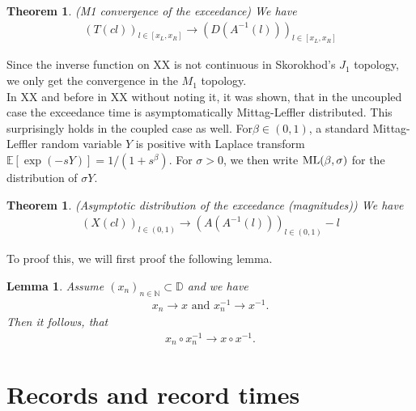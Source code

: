 \documentclass[12pt]{article}
\newtheorem{theorem}[equation]{Theorem}
\newtheorem{lemma}[equation]{Lemma}
\newcommand{\N}{\mathbb{N}}
\newcommand{\E}{\mathbb{E}}
\newcommand{\1}{\mathbf 1}
\newcommand{\D}{\mathbb{D}}
\begin{document}
\begin{theorem}(M1 convergence of the exceedance)
We have 
\begin{align*}
(T(cl))_{l \in [x_L,x_R]}  \rightarrow (D(A^{-1}(l)))_{l \in [x_L,x_R]} 
\end{align*}
\end{theorem}
Since the inverse function on XX is not continuous in Skorokhod's $J_1$ topology, we only get the convergence in the $M_1$ topology.\\
In XX and before in XX without noting it, it was shown, that in the uncoupled case the exceedance time is asymptomatically Mittag-Leffler distributed. This surprisingly holds in the coupled case as well. For$\beta \in (0,1)$, a standard Mittag-Leffler 
random variable $Y$ is positive with Laplace transform
$\E[\exp(-s Y)] = 1/(1+s^\beta)$. For $\sigma > 0$, we then write 
${\rm ML}(\beta, \sigma)$ for the distribution of $\sigma Y$. \\


\begin{theorem}(Asymptotic distribution of the exceedance (magnitudes))
We have 
\begin{align*}
(X(cl))_{l \in (0,1)} \rightarrow (A(A^{-1}(l)))_{l \in (0,1)} - l
\end{align*}
\end{theorem}

To proof this, we will first proof the following lemma.

\begin{lemma} 
Assume $(x_n)_{n \in \N} \subset \D$ and we have
\begin{align*}
x_n \rightarrow x  \text{ and }  x_n^{-1} \rightarrow x^{-1}. 
\end{align*}
Then it follows, that
\begin{align*}
x_n \circ x_n^{-1} \rightarrow x \circ x^{-1}.
\end{align*}
\end{lemma}


\section{Records and record times}
\end{document}
